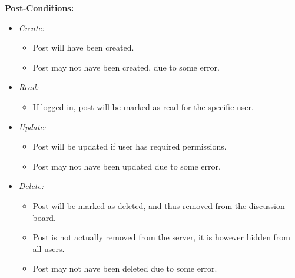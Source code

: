 \documentclass[11pt]{article}
\begin{document}
\begin{enumerate}
\textbf{Post-Conditions: }
\begin{itemize}

\item \textit{Create: }
	\begin{itemize}
	\item Post will have been created.
	\item Post may not have been created, due to some error.
	\end{itemize}
\item \textit{Read: }
	\begin{itemize}
	\item If logged in, post will be marked as read for the specific user.
	\end{itemize}
\item \textit{Update: }
	\begin{itemize}
	\item Post will be updated if user has required permissions.
	\item Post may not have been updated due to some error.
	\end{itemize}
\item \textit{Delete: }
	\begin{itemize}
	\item Post will be marked as deleted, and thus removed from the discussion board.
	\item Post is not actually removed from the server, it is however hidden from all users.
	\item Post may not have been deleted due to some error. 
	\end{itemize}

\end{itemize}
\end{enumerate}
\end{document}
